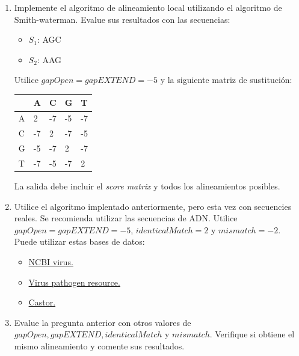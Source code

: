 \documentclass{article}
\begin{document}
	\begin{enumerate}
		
		\item 
		
		 Implemente el algoritmo de alineamiento local utilizando el algoritmo de Smith-waterman. Evalue sus resultados con las secuencias:
				\begin{itemize}
					\item $S_1$: AGC
					\item $S_2$: AAG
				\end{itemize}
			
		Utilice $gapOpen = gapEXTEND = -5$ y la siguiente matriz de sustitución:
		
		\begin{table}[hbt!]
			\centering
			\begin{tabular}{l|llll}
				\textbf{} & A  & C  & G  & T  \\
				\hline
				A         & 2  & -7 & -5 & -7 \\
				C         & -7 & 2  & -7 & -5 \\
				G         & -5 & -7 & 2  & -7 \\
				T         & -7 & -5 & -7 & 2 
			\end{tabular}
		\end{table}
	
		La salida debe incluir el \textit{score matrix} y todos los alineamientos posibles.
			
		\item 
		
		Utilice el algoritmo implentado anteriormente, pero esta vez con secuencies reales. Se recomienda utilizar las secuencias de ADN. Utilice $gapOpen = gapEXTEND = -5$, $identicalMatch = 2$ y $mismatch = -2$. Puede utilizar estas bases de datos:
		
		\begin{itemize}
			\item \href{https://www.ncbi.nlm.nih.gov/genome/viruses/}{NCBI virus.}
			\item \href{https://www.viprbrc.org/brc/home.spg?decorator=vipr}{Virus pathogen resource.}
			\item \href{http://castor.bioinfo.uqam.ca/}{Castor.}
		\end{itemize}
		
		\item 
		Evalue la pregunta anterior con otros valores de $gapOpen, gapEXTEND, identicalMatch$ y $mismatch$. Verifique si obtiene el mismo alineamiento y comente sus resultados.
		

	

	\end{enumerate}
	
	
\end{document}
